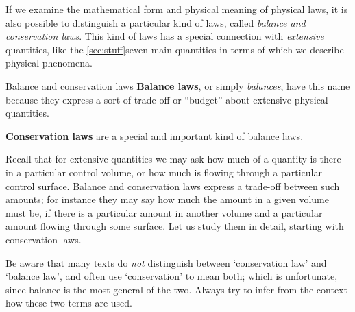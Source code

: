 \documentclass[a4paper,12pt,%
onecolumn,oneside,%
british%
]{memoir}
\renewcommand*{\|}[1][]{\nonscript\:#1\vert\nonscript\:\mathopen{}}
\begin{document}
If we examine the mathematical form and physical meaning of physical laws, it is also possible to distinguish a particular kind of laws, called \emph{balance and conservation laws}. This kind of laws has a special connection with \emph{extensive} quantities, like the \ref{sec:stuff}{seven main quantities} in terms of which we describe physical phenomena.
\begin{definition}{Balance and conservation laws}
  \textbf{Balance laws}, or simply \emph{balances}, have this name because they express a sort of trade-off or \enquote{budget} about extensive physical quantities.

  \textbf{Conservation laws} are a special and important kind of balance laws.
\end{definition}
%

Recall that for extensive quantities we may ask how much of a quantity is there in a particular control volume, or how much is flowing through a particular control surface. Balance and conservation laws express a trade-off between such amounts; for instance they may say how much the amount in a given volume must be, if there is a particular amount in another volume and a particular amount flowing through some surface. Let us study them in detail, starting with conservation laws.


\begin{warning}[\enquote*{Conservation} vs \enquote*{balance} in other texts,label={wa:conservation}]
  Be aware that many texts do \emph{not} distinguish between \enquote*{conservation law} and \enquote*{balance law}, and often use \enquote*{conservation} to mean both; which is unfortunate, since balance is the most general of the two. Always try to infer from the context how these two terms are used.
\end{warning}
\end{document}
